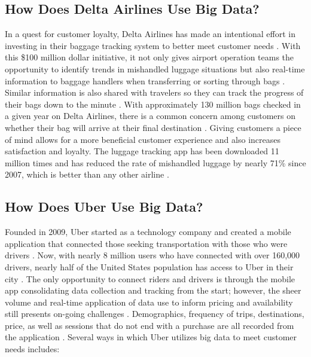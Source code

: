 \documentclass[sigconf]{acmart}
\begin{document}
\subsection{How Does Delta Airlines Use Big Data?}
In a quest for customer loyalty, Delta Airlines has made an intentional effort in investing in their baggage tracking system to better meet customer needs \cite{School2015}. With this \$100 million dollar initiative, it not only gives airport operation teams the opportunity to identify trends in mishandled luggage situations but also real-time information to baggage handlers when transferring or sorting through bags \cite{School2015}. Similar information is also shared with travelers so they can track the progress of their bags down to the minute \cite{School2015}. With approximately 130 million bags checked in a given year on Delta Airlines, there is a common concern among customers on whether their bag will arrive at their final destination \cite{Noyes2014}. Giving customers a piece of mind allows for a more beneficial customer experience and also increases satisfaction and loyalty. The luggage tracking app has been downloaded 11 million times and has reduced the rate of mishandled luggage by nearly 71\% since 2007, which is better than any other airline \cite{School2015}. 

\subsection{How Does Uber Use Big Data?}
Founded in 2009, Uber started as a technology company and created a mobile application that connected those seeking transportation with those who were drivers \cite{Cohen2016}. Now, with nearly 8 million users who have connected with over 160,000 drivers, nearly half of the United States population has access to Uber in their city \cite{Institute2017}. The only opportunity to connect riders and drivers is through the mobile app consolidating data collection and tracking from the start; however, the sheer volume and real-time application of data use to inform pricing and availability still presents on-going challenges \cite{Cohen2016}. Demographics, frequency of trips, destinations, price, as well as sessions that do not end with a purchase are all recorded from the application \cite{Cohen2016}. Several ways in which Uber utilizes big data to meet customer needs includes:
\end{document}
